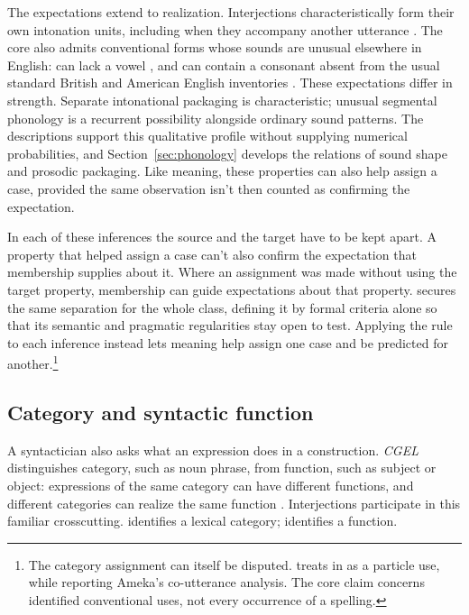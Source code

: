 \documentclass[12pt]{article}
\begin{document}
The expectations extend to realization. Interjections characteristically
form their own intonation units, including when they accompany another
utterance \citep[108]{ameka1992}. The core also admits conventional forms
whose sounds are unusual elsewhere in English:  can lack a
vowel \citep[105--106]{ameka1992}, and  can contain a
consonant absent from the usual standard British and American English
inventories \citep[74, 853]{quirk1985}. These expectations differ in
strength. Separate intonational packaging is characteristic; unusual
segmental phonology is a recurrent possibility alongside ordinary sound
patterns. The descriptions support this qualitative profile without
supplying numerical probabilities, and Section~\ref{sec:phonology} develops
the relations of sound shape and prosodic packaging. Like meaning, these
properties can also help assign a case, provided the same observation isn't
then counted as confirming the expectation.

In each of these inferences the source and the target have to be kept
apart. A property that helped assign a case can't also confirm the
expectation that membership supplies about it. Where an assignment was
made without using the target property, membership can guide expectations
about that property. \textcite[124]{wilkins1992} secures the same separation
for the whole class, defining it by formal criteria alone so that its
semantic and pragmatic regularities stay open to test. Applying the rule to
each inference instead lets meaning help assign one case and be predicted
for another.\footnote{The category assignment can
itself be disputed. \textcite[126--127 n.~5]{wilkins1992} treats  in  as a particle use, while reporting Ameka's
co-utterance analysis. The core claim
concerns identified conventional uses, not every occurrence of a spelling.}

\subsection{Category and syntactic function}\label{sec:syntactic-function}

A syntactician also asks what an expression does in a construction.
\textit{CGEL} distinguishes category, such as noun phrase, from function,
such as subject or object: expressions of the same category can
have different functions, and different categories can realize the same
function \citep[23]{HuddlestonPullum2002}. Interjections participate in
this familiar crosscutting.  identifies a lexical category;
 identifies a function.
\end{document}
